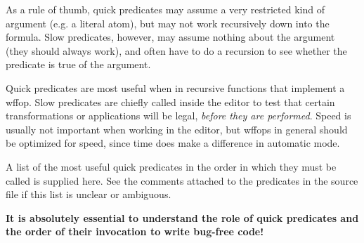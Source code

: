 As a rule of thumb, quick predicates may assume a very restricted kind
of argument (e.g. a literal atom), but may not work recursively down
into the formula.  Slow predicates, however, may assume nothing about
the argument (they should always work), and often have to do a recursion
to see whether the predicate is true of the argument.

Quick predicates are most useful when in recursive functions that implement
a wffop.  Slow predicates are chiefly called inside the editor to test
that certain transformations or applications will be legal, {\it before they
are performed}.  Speed is usually not important when working in the editor,
but wffops in general should be optimized for speed, since time does make
a difference in automatic mode.

A list of the most useful quick predicates in the order in which they must
be called is supplied here.  See the comments attached to the predicates
in the source file if this list is unclear or ambiguous.

{\bf It is absolutely essential to understand the role of quick
predicates and the order of their invocation to write bug-free code!}


